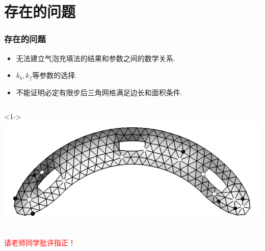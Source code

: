 \documentclass[UTF8]{ctexbeamer}	%
\theoremstyle{plain}
\theoremstyle{definition}
\theoremstyle{remark}
\numberwithin{equation}{section}
\begin{document}
\section{存在的问题}
    \begin{frame}
        \frametitle{存在的问题}
    \begin{itemize}
        \item 无法建立气泡充填法的结果和参数之间的数学关系.
        \item $k_b, k_f$等参数的选择.
        \item 不能证明必定有限步后三角网格满足边长和面积条件.
    \end{itemize}
    \begin{columns}
        <1->
        \includegraphics[width = \textwidth]{fig/weakness.png}
     \end{columns}

\end{frame}

\begin{frame}
    \centering\huge
    \textcolor{red}{请老师同学批评指正！}
\end{frame}
\end{document}
